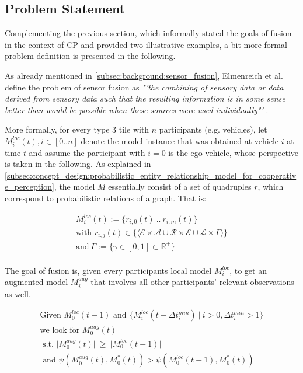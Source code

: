 \subsection{Problem Statement}
\label{subsec:concept_design:fusion_problem_statement}
Complementing the previous section, which informally stated the goals of fusion in the context of CP and provided two illustrative examples, a bit more formal problem definition is presented in the following.

As already mentioned in \cref{subsec:background:sensor_fusion}, Elmenreich et al. define the problem of sensor fusion as \textit{"'the combining of sensory data or data derived from sensory data such that the resulting information is in some sense better than would be possible when these sources were used individually"'} \cite{Elmenreich2002}.
\par
\bigskip

More formally, for every type 3 tile with $n$ participants (e.g. vehicles), let $M^{loc}_i(t), i \in [0..n]$ denote the model instance that was obtained at vehicle $i$ at time $t$ and assume the participant with $i = 0$ is the ego vehicle, whose perspective is taken in the following. As explained in \cref{subsec:concept_design:probabilistic_entity_relationship_model_for_cooperative_perception}, the model $M$ essentially consist of a set of quadruples $r$, which correspond to probabilistic relations of a graph. That is:

\begin{gather*}
	M^{loc}_i(t) := \{r_{i,0}(t) \ .. \ r_{i,m}(t)\} \\ 
	\text{with\ } r_{i,j}(t) \in \{ \langle \mathcal{E} \times \mathcal{A} \cup \mathcal{R} \times \mathcal{E} \cup \mathcal{L} \times \Gamma \rangle \} \\
	\text{and} \  \Gamma := \{ \gamma \in [0, 1] \subset \mathbb{R}^+ \} \\
\end{gather*}

The goal of fusion is, given every participants local model $M^{loc}_i$, to get an augmented model $M^{aug}_i$ that involves all other participants' relevant observations as well.

\begin{gather*}
	\text{Given\ } M^{loc}_0(t-1) \text{\ and\ } \{M^{loc}_i(t - \Delta t^{min}_i)\ |\ i > 0, \Delta t^{min}_i > 1\} \\
	\text{we look for\ } M^{aug}_0(t) \\ 
	\text{\ s.t.\ } \bigl|  M^{aug}_0(t) \bigl| \ \geqslant \ \bigl| M^{loc}_0(t-1) \bigl| \\
	\text{\ and\ } \psi(M^{aug}_0(t), M^{*}_0(t)) > \psi(M^{loc}_0(t-1), M^{*}_0(t))
\end{gather*}

